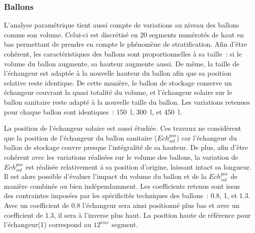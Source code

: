 \subsubsection{Ballons} %
\label{ssub:ballons}
L’analyse paramétrique tient aussi compte de variations au niveau des ballons comme
son volume. Celui-ci est discrétisé en \num{20} segments numérotés de haut en bas
permettant de prendre en compte le phénomène de stratification.
Afin d’être cohérent, les caractéristiques des ballons sont proportionnelles à sa taille~:
si le volume du ballon augmente, sa hauteur augmente aussi.
De même, la taille de l’échangeur est adaptée à la nouvelle hauteur du ballon
afin que sa position relative reste identique. De cette manière, le ballon de
stockage conserve un échangeur couvrant la quasi totalité du volume, et
l’échangeur solaire sur le ballon sanitaire reste adapté à la nouvelle taille du
ballon. Les variations retenues pour chaque ballon sont identiques~:
\SI{150}{l}, \SI{300}{l}, et \SI{450}{l}.

La position de l’échangeur solaire est aussi étudiée. Ces travaux ne considèrent que
la position de l’échangeur du ballon sanitaire ($Ech_{sol}^{pos}$) car l’échangeur du
ballon de stockage couvre presque l’intégralité de sa hauteur. De plus, afin d’être
cohérent avec les variations réalisées sur le volume des ballons, la variation de
$Ech_{sol}^{pos}$ est réalisée relativement à sa position d’origine, laissant intact sa
longueur. Il est alors possible d’évaluer l’impact du volume du ballon et de la $Ech_{sol}^{pos}$
de manière combinée ou bien indépendamment. Les coefficients
retenus sont issus des contraintes imposées par les spécificités techniques des ballons~:
\num{0.8}, \num{1}, et \num{1.3}. Avec un coefficient de \num{0.8} l’échangeur sera ainsi
positionné plus bas et avec un coefficient de \num{1.3}, il sera à l’inverse plus haut. La
position haute de référence pour l’échangeur(\num{1}) correspond au $12^{ème}$ segment.


